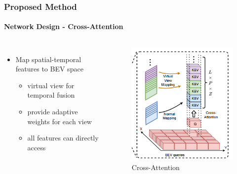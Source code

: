 \documentclass[
	12pt, %
	aspectratio=169, %
]{beamer}
\begin{document}
\begin{frame}
	\frametitle{Proposed Method}
	\framesubtitle{Network Design - Cross-Attention}

	\begin{columns}
		\begin{itemize}
			\item Map spatial-temporal features to BEV space
			\begin{itemize}
				\item virtual view for temporal fusion
				\item provide adaptive weights for each view
				\item all features can directly access
			\end{itemize}
		\end{itemize}

		\begin{figure}
			\centering
			\includegraphics[width=0.8\linewidth]{"./Images/cross_attention.png"}
			\caption{Cross-Attention}
		\end{figure}
	\end{columns}
\end{frame}
\end{document}
